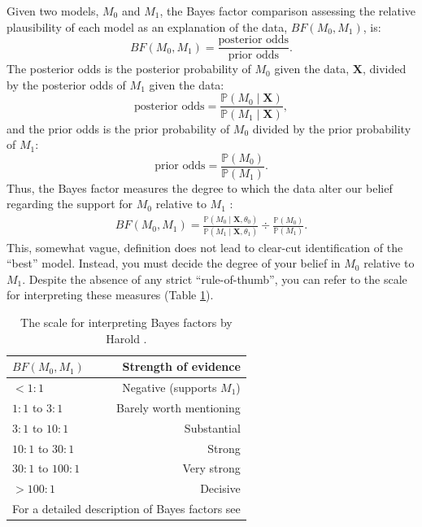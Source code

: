 \documentclass[11pt]{article}
\begin{document}
Given two models, $M_0$ and $M_1$, the Bayes factor comparison assessing the relative plausibility of each model as an explanation of the data, $BF(M_0,M_1)$, is:
$$BF(M_0,M_1) = \frac{\mbox{posterior odds}}{\mbox{prior odds}}.$$
The posterior odds is the posterior probability of $M_0$ given the data, $\mathbf X$, divided by the posterior odds of $M_1$ given the data:
$$\mbox{posterior odds} = \frac{\mathbb{P}(M_0 \mid \mathbf X)}{\mathbb{P}(M_1 \mid \mathbf X)},$$
and the prior odds is the prior probability of $M_0$ divided by the prior probability of $M_1$:
$$\mbox{prior odds} = \frac{\mathbb{P}(M_0)}{\mathbb{P}(M_1)}.$$
Thus, the Bayes factor measures the degree to which the data alter our belief regarding the support for $M_0$ relative to $M_1$ \citep{lavine1999bayes}:
\begin{align}\label{BFeq1}
BF(M_0,M_1) = \frac{\mathbb{P}(M_0 \mid \mathbf X, \theta_0)}{\mathbb{P}(M_1 \mid \mathbf X, \theta_1)} \div \frac{\mathbb{P}(M_0)}{\mathbb{P}(M_1)}. 
\end{align}
This, somewhat vague, definition does not lead to clear-cut identification of the ``best'' model. Instead, you must decide the degree of your belief in $M_0$ relative to $M_1$. 
Despite the absence of any strict ``rule-of-thumb'', you can refer to the scale \citep[outlined by][]{jeffreys61} for interpreting these measures (Table \ref{bftable}).
\begin{table}[h]
\centering
\caption{\small The scale for interpreting Bayes factors by Harold \citet{jeffreys61}.} 
\label{bftable}
\begin{tabular}{l c r}
\hline
\multicolumn{1}{l}{\textbf{$BF(M_0, M_1)$}} & \multicolumn{1}{r}{ } &\multicolumn{1}{r}{{Strength of evidence}} \\ 
\hline
$<1:1$ & \hspace{8mm} & Negative (supports $M_1$)\\
$1:1$ to $3:1$ & & Barely worth mentioning\\
$3:1$ to $10:1$ & & Substantial\\
$10:1$ to $30:1$ & & Strong\\
$30:1$ to $100:1$ & & Very strong\\
$>100:1$ & & Decisive\\
\hline
\multicolumn{3}{l}{{\scriptsize{For a detailed description of Bayes factors see \citet{kass95}}}} 
\end{tabular}
\end{table}
\end{document}
